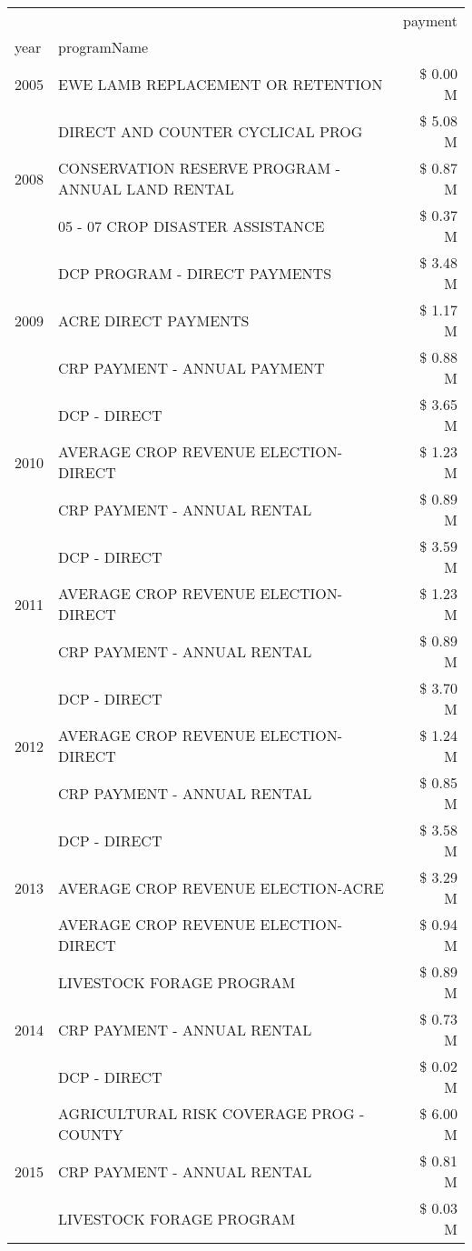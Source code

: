 \begin{tabular}{llr}
\toprule
 &  & payment \\
year & programName &  \\
\midrule
2005 & EWE LAMB REPLACEMENT OR RETENTION & \$ 0.00 M \\
\cline{1-3}
\multirow[t]{3}{*}{2008} & DIRECT AND COUNTER CYCLICAL PROG & \$ 5.08 M \\
 & CONSERVATION RESERVE PROGRAM - ANNUAL LAND RENTAL & \$ 0.87 M \\
 & 05 - 07 CROP DISASTER ASSISTANCE & \$ 0.37 M \\
\cline{1-3}
\multirow[t]{3}{*}{2009} & DCP PROGRAM - DIRECT PAYMENTS & \$ 3.48 M \\
 & ACRE DIRECT PAYMENTS & \$ 1.17 M \\
 & CRP PAYMENT - ANNUAL PAYMENT & \$ 0.88 M \\
\cline{1-3}
\multirow[t]{3}{*}{2010} & DCP - DIRECT & \$ 3.65 M \\
 & AVERAGE CROP REVENUE ELECTION-DIRECT & \$ 1.23 M \\
 & CRP PAYMENT - ANNUAL RENTAL & \$ 0.89 M \\
\cline{1-3}
\multirow[t]{3}{*}{2011} & DCP - DIRECT & \$ 3.59 M \\
 & AVERAGE CROP REVENUE ELECTION-DIRECT & \$ 1.23 M \\
 & CRP PAYMENT - ANNUAL RENTAL & \$ 0.89 M \\
\cline{1-3}
\multirow[t]{3}{*}{2012} & DCP - DIRECT & \$ 3.70 M \\
 & AVERAGE CROP REVENUE ELECTION-DIRECT & \$ 1.24 M \\
 & CRP PAYMENT - ANNUAL RENTAL & \$ 0.85 M \\
\cline{1-3}
\multirow[t]{3}{*}{2013} & DCP - DIRECT & \$ 3.58 M \\
 & AVERAGE CROP REVENUE ELECTION-ACRE & \$ 3.29 M \\
 & AVERAGE CROP REVENUE ELECTION-DIRECT & \$ 0.94 M \\
\cline{1-3}
\multirow[t]{3}{*}{2014} & LIVESTOCK FORAGE PROGRAM & \$ 0.89 M \\
 & CRP PAYMENT - ANNUAL RENTAL & \$ 0.73 M \\
 & DCP - DIRECT & \$ 0.02 M \\
\cline{1-3}
\multirow[t]{3}{*}{2015} & AGRICULTURAL RISK COVERAGE PROG - COUNTY & \$ 6.00 M \\
 & CRP PAYMENT - ANNUAL RENTAL & \$ 0.81 M \\
 & LIVESTOCK FORAGE PROGRAM & \$ 0.03 M \\

\end{tabular}
